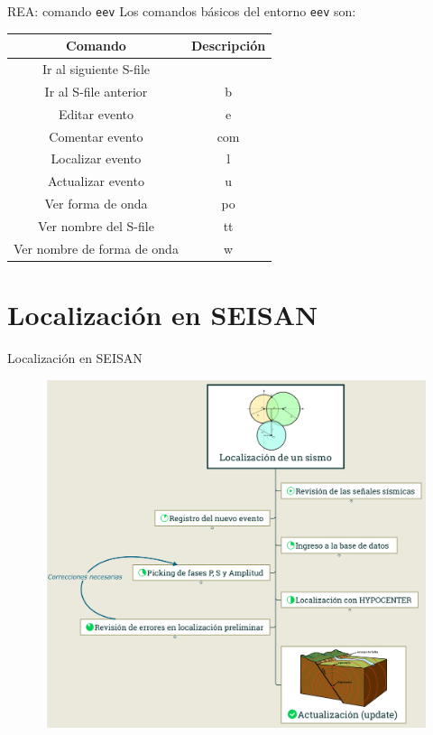 \documentclass[11pt]{beamer}
\begin{document}
\begin{frame}{REA: comando {\tt eev}}
Los comandos básicos del entorno {\tt eev} son: 
\begin{table}
\begin{tabular}{|c|c|}
\hline 
{\bf Comando}  & {\bf Descripción} \\ 
\hline 
Ir al siguiente S-file & \keys{\return} \\ 
\hline 
Ir al S-file anterior & b \keys{\return} \\ 
\hline 
Editar evento & e \keys{\return} \\ 
\hline 
Comentar evento & com \keys{\return} \\ 
\hline
Localizar evento & l \keys{\return} \\ 
\hline
Actualizar evento & u \keys{\return} \\ 
\hline
Ver forma de onda & po \keys{\return} \\ 
\hline
Ver nombre del S-file & tt \keys{\return} \\ 
\hline
Ver nombre de forma de onda & w \keys{\return} \\ 
\hline
\end{tabular} 
\end{table}
\end{frame}

\section{Localización en SEISAN}

\begin{frame}{Localización en SEISAN}
\begin{figure}
\includegraphics[scale=0.15]{localizacion_1.png}
\end{figure}
\end{frame}
\end{document}
